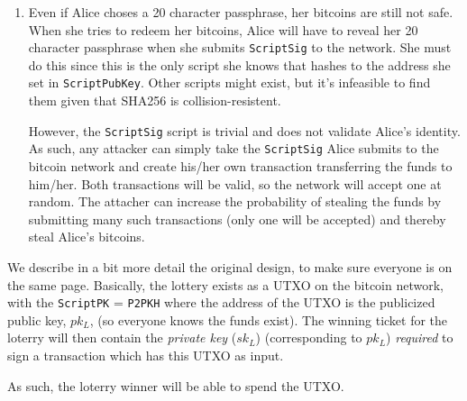 \documentclass[12pt]{exam}
\newcommand{\Q}[1]{\question{\large{\textbf{#1}}}}
\begin{document}
\begin{questions}
\begin{solution}
\begin{enumerate}[label=\textbf{\alph*}.]
    \item Even if Alice choses a 20 character passphrase, her bitcoins are still not safe. When she tries to redeem her bitcoins, Alice will have to reveal her 20 character passphrase when she submits \texttt{ScriptSig} to the network. She must do this since this is the only script she knows that hashes to the address she set in \texttt{ScriptPubKey}. Other scripts might exist, but it's infeasible to find them given that SHA256 is collision-resistent.

    However, the \texttt{ScriptSig} script is trivial and does not validate Alice's identity. As such, any attacker can simply take the \texttt{ScriptSig} Alice submits to the bitcoin network and create his/her own transaction transferring the funds to him/her. Both transactions will be valid, so the network will accept one at random. The attacher can increase the probability of stealing the funds by submitting many such transactions (only one will be accepted) and thereby steal Alice's bitcoins.
  \end{enumerate}
\end{solution}

\newpage
\Q{BitcoinLotto}
\begin{solution}
  We describe in a bit more detail the original design, to make sure everyone is on the same page. Basically, the lottery exists as a UTXO on the bitcoin network, with the \texttt{ScriptPK} = \texttt{P2PKH} where the address of the UTXO is the publicized public key, $pk_L$, (so everyone knows the funds exist). The winning ticket for the loterry will then contain the \textit{private key} ($sk_L$) (corresponding to $pk_L$) \textit{required} to sign a transaction which has this UTXO as input.

  As such, the loterry winner will be able to spend the UTXO.


\end{solution}
\end{questions}
\end{document}
